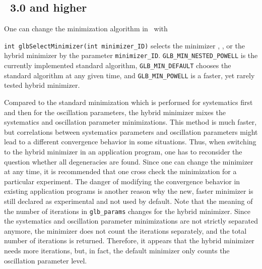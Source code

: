 \subsection*{\GLOBES\ 3.0 and higher}

One can change the minimization algorithm in \GLOBES\ with
\begin{function}
{\tt int glbSelectMinimizer(int minimizer\_ID)} selects the minimizer , , or the hybrid minimizer  by the parameter {\tt minimizer\_ID}. 
{\tt GLB\_MIN\_NESTED\_POWELL} is the currently implemented standard algorithm, {\tt GLB\_MIN\_DEFAULT} chooses the standard algorithm at any given time, and {\tt GLB\_MIN\_POWELL} is a faster, yet rarely tested hybrid
minimizer.
\end{function}
Compared to the standard minimization which is performed for systematics first and then for the
oscillation parameters, the hybrid minimizer mixes the systematics and oscillation parameter minimizations. 
This method is much faster,
but correlations between systematics parameters and oscillation parameters might lead to a different convergence behavior in some situations. Thus, when switching to the hybrid minimizer in an application program, one has to reconsider the question whether all degeneracies are found. Since one can change the minimizer at any time, it is recommended that one cross check the minimization for a particular experiment. The danger of modifying the convergence behavior in existing application programs is another reason why the new, faster minimizer is still declared as experimental and not used by default. Note that the meaning of the number of iterations in {\tt glb\_params} changes for the hybrid minimizer. Since the systematics and oscillation parameter minimizations are not strictly separated anymore,  the minimizer does not count the iterations separately, and the total number of iterations is returned. Therefore, it appears that the hybrid minimizer needs more iterations, but, in fact, the default minimizer only counts the oscillation parameter level.


